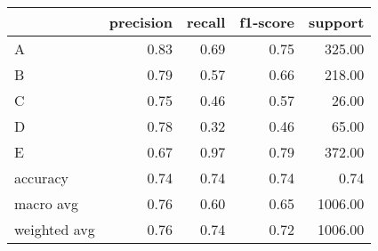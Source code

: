 \begin{tabular}{|l|r|r|r|r|}
\hline
{} &  precision &  recall &  f1-score &  support \\
\hline
A            &       0.83 &    0.69 &      0.75 &   325.00 \\
B            &       0.79 &    0.57 &      0.66 &   218.00 \\
C            &       0.75 &    0.46 &      0.57 &    26.00 \\
D            &       0.78 &    0.32 &      0.46 &    65.00 \\
E            &       0.67 &    0.97 &      0.79 &   372.00 \\
accuracy     &       0.74 &    0.74 &      0.74 &     0.74 \\
macro avg    &       0.76 &    0.60 &      0.65 &  1006.00 \\
weighted avg &       0.76 &    0.74 &      0.72 &  1006.00 \\
\hline
\end{tabular}
